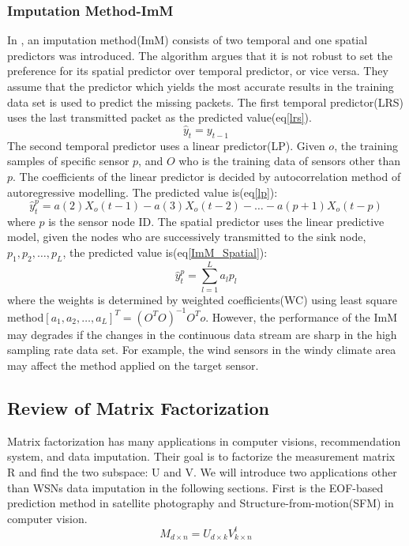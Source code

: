 \subsubsection{Imputation Method-ImM}
 In \cite{Lim:robust}, an imputation method(ImM) consists of two temporal and one spatial predictors was introduced.  The algorithm argues that it is not robust to set the preference for its spatial predictor over temporal predictor, or vice versa.
They assume that the predictor which yields the most accurate results in the training data set is used to predict the missing packets. 
The first temporal predictor(LRS) uses the last transmitted packet as the predicted value(eq\ref{lrs}).
\begin{equation}
\hat{y}_{t} =y_{t-1} \label{lrs}
\end{equation} 
 The second temporal predictor uses a linear predictor(LP). Given $o$, the training samples of specific sensor $p$, and $O$ who is the training data of sensors other than $p$. The coefficients of the linear predictor is decided by autocorrelation method of autoregressive modelling. The predicted value is(eq\ref{lp}):
\begin{equation}
\hat{y}_{t}^p = a(2)X_o(t-1) - a(3)X_o(t-2)- \dots -a(p+1)X_o(t-p) \label{lp}
\end{equation} 
where $p$ is the sensor node ID.  
The spatial predictor uses the linear predictive model, given the nodes who are successively transmitted to the sink node, $p_1,p_2,\dots,p_L$, the predicted value is(eq\ref{ImM_Spatial}): 
\begin{equation}
\hat{y}_{t}^p = \sum_{l=1}^L a_lp_l
\label{ImM_Spatial}
\end{equation}
 where the weights is determined by weighted coefficients(WC) using least square method$[a_1,a_2,\dots,a_L]^T = (O^TO)^{-1}O^To$.
However, the performance of the ImM may degrades if the changes in the continuous data stream are sharp in the high sampling rate data set. 
For example, the wind sensors in the windy climate area may affect the method applied on the target sensor.  
\subsection{Review of Matrix Factorization  }
Matrix factorization has many applications in computer visions, recommendation system\cite{chen2011linear}, and data imputation. Their goal is to factorize the measurement matrix R and find the two subspace: U and V. We will introduce two applications other than WSNs data imputation in the following sections. First is the EOF-based prediction method in satellite photography and Structure-from-motion(SFM) in computer vision.
\begin{equation}
M_{d\times n}= U_{d\times k}V^t_{k\times n}
\end{equation}

